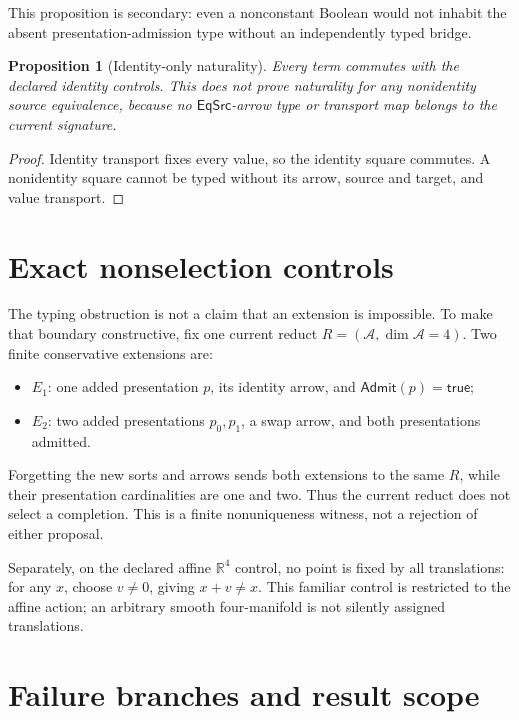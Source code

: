 \documentclass[11pt]{article}
\newtheorem{proposition}{Proposition}
\newcommand{\EqSrc}{\mathsf{EqSrc}}
\begin{document}
This proposition is secondary: even a nonconstant Boolean would not inhabit
the absent presentation-admission type without an independently typed bridge.

\begin{proposition}[Identity-only naturality]
Every term commutes with the declared identity controls.  This does not prove
naturality for any nonidentity source equivalence, because no
\(\EqSrc\)-arrow type or transport map belongs to the current signature.
\end{proposition}

\begin{proof}
Identity transport fixes every value, so the identity square commutes.  A
nonidentity square cannot be typed without its arrow, source and target, and
value transport.
\end{proof}

\section{Exact nonselection controls}

The typing obstruction is not a claim that an extension is impossible.  To
make that boundary constructive, fix one current reduct
\(R=(\mathcal A,\dim\mathcal A=4)\).  Two finite conservative extensions are:
\begin{itemize}
  \item \(E_1\): one added presentation \(p\), its identity arrow, and
  \(\mathsf{Admit}(p)=\mathsf{true}\);
  \item \(E_2\): two added presentations \(p_0,p_1\), a swap arrow, and both
  presentations admitted.
\end{itemize}
Forgetting the new sorts and arrows sends both extensions to the same \(R\),
while their presentation cardinalities are one and two.  Thus the current
reduct does not select a completion.  This is a finite nonuniqueness witness,
not a rejection of either proposal.

Separately, on the declared affine \(\mathbb R^4\) control, no point is fixed by
all translations: for any \(x\), choose \(v\neq0\), giving \(x+v\neq x\).
This familiar control is restricted to the affine action; an arbitrary smooth
four-manifold is not silently assigned translations.

\section{Failure branches and result scope}
\end{document}
